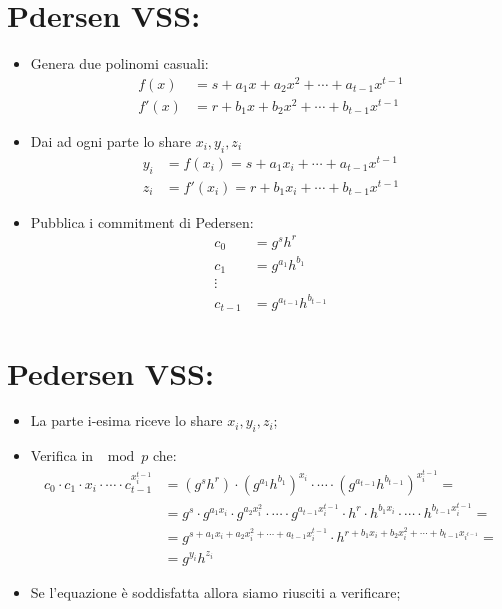 \documentclass{book}
\begin{document}
\section{Pdersen VSS:\@dealer}
\begin{itemize}
    \item Genera due polinomi casuali:\begin{align*}
              f(x)  & =s+a_{1}x+a_{2}x^2+\cdots +a_{t-1}x^{t-1} \\
              f'(x) & =r+b_{1}x+b_{2}x^2+\cdots +b_{t-1}x^{t-1}
          \end{align*}
    \item Dai ad ogni parte lo share \(x_{i},y_{i},z_{i}\)
          \begin{align*}
              y_{i} & =f(x_{i})=s+a_{1}x_{i}+\cdots +a_{t-1}x^{t-1}  \\
              z_{i} & =f'(x_{i})=r+b_{1}x_{i}+\cdots +b_{t-1}x^{t-1}
          \end{align*}
    \item Pubblica i commitment di Pedersen:\begin{align*}
              c_{0}   & =g^{s}h^r               \\
              c_{1}   & =g^{a_{1}}h^{b_{1}}     \\
              \vdots                            \\
              c_{t-1} & =g^{a_{t-1}}h^{b_{t-1}}
          \end{align*}
\end{itemize}
\section{Pedersen VSS:\@verifier}
\begin{itemize}
    \item La parte i-esima riceve lo share \(x_{i},y_{i},z_{i}\);
    \item Verifica in \(\mod{p}\) che:\begin{align*}
              c_{0}\cdot c_{1}\cdot x_{i}\cdot \cdots \cdot c_{t-1}^{x_{i}^{t-1}} & ={(g^{s}h^{r})}\cdot {(g^{a_{1}}h^{b_{1}})}^{x_{i}}\cdot\cdots\cdot {(g^{a_{t-1}}h^{b_{t-1}})}^{x_{i}^{t-1}}=                                                  \\
                                                                                  & =g^{s}\cdot g^{a_{1}x_{i}}\cdot g^{a_{2}x_{i}^2}\cdot\cdots\cdot g^{a_{t-1}x_{i}^{t-1}}\cdot h^{r}\cdot h^{b_{1}x_{i}}\cdot\cdots\cdot h^{b_{t-1}x_{i}^{t-1}}= \\
                                                                                  & =g^{s+a_{1}x_{i}+a_{2}x_{i}^2+\cdots+ a_{t-1}x_{i}^{t-1}}\cdot h^{r+b_{1}x_{i}+b_{2}x_{i}^2+\cdots+b_{t-1}x_{i^{t-1}}}=                                        \\
                                                                                  & =g^{y_{i}}h^{z_{i}}
          \end{align*}
    \item Se l'equazione è soddisfatta allora siamo riusciti a verificare;
\end{itemize}
\newpage
\end{document}
